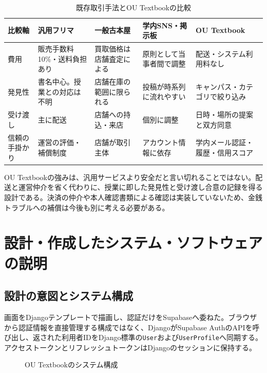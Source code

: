 \documentclass[11pt,a4paper]{jsarticle}
\begin{document}
\begin{table}[htbp]
  \centering
  \caption{既存取引手法とOU Textbookの比較}
  \label{tab:comparison}
  \scriptsize
  \begin{tabularx}{\textwidth}{@{}p{}YYYY@{}}
    \toprule
    比較軸 & 汎用フリマ & 一般古本屋 & 学内SNS・掲示板 & OU Textbook \\
    \midrule
    費用 &
    販売手数料10\%・送料負担あり &
    買取価格は店舗査定による &
    原則として当事者間で調整 &
    配送・システム利用料なし \\
    発見性 &
    書名中心。授業との対応は不明 &
    店舗在庫の範囲に限られる &
    投稿が時系列に流れやすい &
    キャンパス・カテゴリで絞り込み \\
    受け渡し &
    主に配送 &
    店舗への持込・来店 &
    個別に調整 &
    日時・場所の提案と双方同意 \\
    信頼の手掛かり &
    運営の評価・補償制度 &
    店舗が取引主体 &
    アカウント情報に依存 &
    学内メール認証・履歴・信用スコア \\
    \bottomrule
  \end{tabularx}
\end{table}

OU Textbookの強みは、汎用サービスより安全だと言い切れることではない。配送と運営仲介を省く代わりに、授業に即した発見性と受け渡し合意の記録を得る設計である。決済の仲介や本人確認書類による確認は実装していないため、金銭トラブルへの補償は今後も別に考える必要がある。

\section{設計・作成したシステム・ソフトウェアの説明}

\subsection{設計の意図とシステム構成}
画面をDjangoテンプレートで描画し、認証だけをSupabaseへ委ねた。ブラウザから認証情報を直接管理する構成ではなく、DjangoがSupabase AuthのAPIを呼び出し、返された利用者IDをDjango標準の\texttt{User}および\texttt{UserProfile}へ同期する。アクセストークンとリフレッシュトークンはDjangoのセッションに保持する。

\begin{figure}[htbp]
  \centering
  \caption{OU Textbookのシステム構成}
  \label{fig:architecture}
\end{figure}
\end{document}
